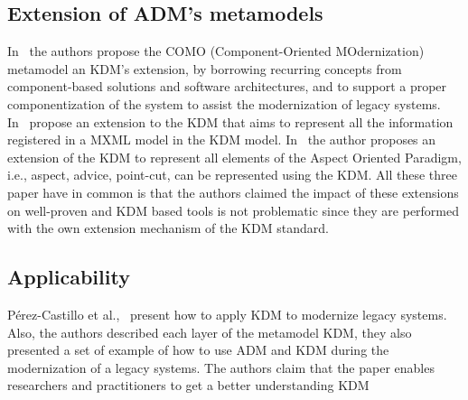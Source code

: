 \subsection{Extension of ADM's metamodels} %
\label{ssub:extension_of_adm_s_metamodels}


In~\cite{5773392} the authors propose the COMO (Component-Oriented MOdernization) metamodel an KDM's extension, by borrowing recurring concepts from component-based solutions and software architectures, and to support a proper componentization of the system to assist the modernization of legacy systems. In~\cite{Perez-Castillo:2012:IEL:2231936.2231949} propose an extension to the KDM that aims to represent all the information registered in a MXML model in the KDM model. In~\cite{library7329} the author proposes an extension of the KDM to represent all elements of the Aspect Oriented Paradigm, i.e., aspect, advice, point-cut, can be represented using the KDM. All these three paper have in common is that the authors claimed the impact of these extensions on well-proven and KDM based tools is not problematic since they are performed with the own extension mechanism of the KDM standard.


\subsection{Applicability} %
\label{ssub:applicability}


P\'{e}rez-Castillo et al.,~\cite{PrezCastillo2011519, Perez-Castillo:2012:IEL:2231936.2231949, 6498507} present how to apply KDM to modernize legacy systems. Also, the authors described each layer of the metamodel KDM, they also presented a set of example of how to use ADM and KDM during the modernization of a legacy systems. The authors claim that the paper enables researchers and practitioners to get a better understanding KDM









